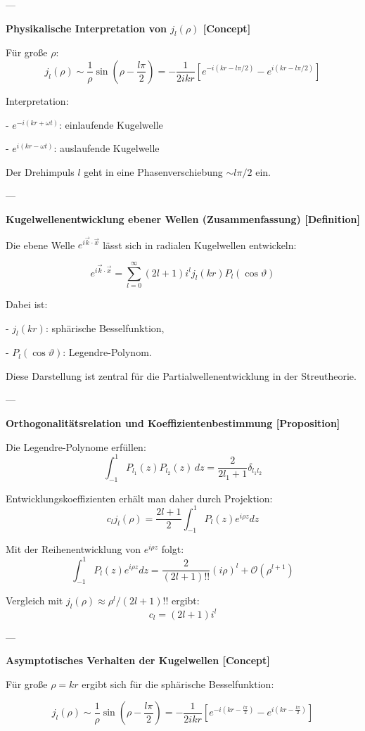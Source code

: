\documentclass[10pt, letterpaper]{article}
\begin{document}
---

\textbf{Physikalische Interpretation von $j_l(\rho)$ [Concept]}

Für große $\rho$:
\[
j_l(\rho) \sim \frac{1}{\rho} \sin \left( \rho - \frac{l\pi}{2} \right)
= -\frac{1}{2ikr} \left[ e^{-i(kr - l\pi/2)} - e^{i(kr - l\pi/2)} \right]
\]

Interpretation:

- $e^{-i(kr + \omega t)}$: einlaufende Kugelwelle

- $e^{i(kr - \omega t)}$: auslaufende Kugelwelle

Der Drehimpuls $l$ geht in eine Phasenverschiebung $\sim l\pi/2$ ein.

---


\textbf{Kugelwellenentwicklung ebener Wellen (Zusammenfassung) [Definition]}

Die ebene Welle $e^{i \vec{k} \cdot \vec{x}}$ lässt sich in radialen Kugelwellen entwickeln:

\[
e^{i \vec{k} \cdot \vec{x}} = \sum_{l=0}^\infty (2l+1) i^l j_l(kr) P_l(\cos \vartheta)
\]

Dabei ist:

- $j_l(kr)$: sphärische Besselfunktion,

- $P_l(\cos \vartheta)$: Legendre-Polynom.

Diese Darstellung ist zentral für die Partialwellenentwicklung in der Streutheorie.

---

\textbf{Orthogonalitätsrelation und Koeffizientenbestimmung [Proposition]}

Die Legendre-Polynome erfüllen:
\[
\int_{-1}^{1} P_{l_1}(z) P_{l_2}(z) \, dz = \frac{2}{2l_1 + 1} \delta_{l_1 l_2}
\]

Entwicklungskoeffizienten erhält man daher durch Projektion:
\[
c_l j_l(\rho) = \frac{2l+1}{2} \int_{-1}^{1} P_l(z) e^{i \rho z} dz
\]

Mit der Reihenentwicklung von $e^{i \rho z}$ folgt:
\[
\int_{-1}^{1} P_l(z) e^{i \rho z} dz = \frac{2}{(2l+1)!!} (i \rho)^l + \mathcal{O}(\rho^{l+1})
\]

Vergleich mit $j_l(\rho) \approx \rho^l / (2l+1)!!$ ergibt:
\[
c_l = (2l+1) i^l
\]

---

\textbf{Asymptotisches Verhalten der Kugelwellen [Concept]}

Für große $\rho = kr$ ergibt sich für die sphärische Besselfunktion:

\[
j_l(\rho) \sim \frac{1}{\rho} \sin \left( \rho - \frac{l\pi}{2} \right) = -\frac{1}{2ikr} \left[ e^{-i(kr - \frac{l\pi}{2})} - e^{i(kr - \frac{l\pi}{2})} \right]
\]
\end{document}
